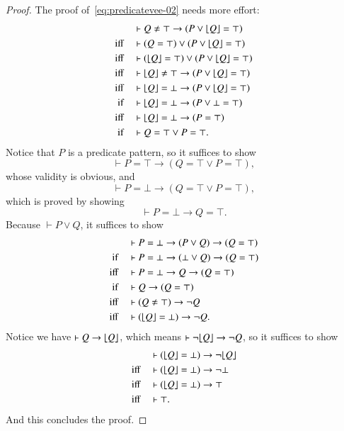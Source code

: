 \documentclass{article}
\theoremstyle{plain}
\DeclarePairedDelimiter\floor{\lfloor}{\rfloor}
\begin{document}
\begin{proof}
The proof of~\eqref{eq:predicatevee-02} needs more effort:
\begin{align*}
&\vdash Q \neq \top \to (P \vee \floor*{Q} = \top) \\
\text{iff} \quad &\vdash (Q = \top) \vee (P \vee \floor*{Q} = \top) \\
\text{iff} \quad &\vdash (\floor*{Q} = \top) \vee (P \vee \floor*{Q} = \top) \\
\text{iff} \quad &\vdash \floor*{Q} \neq \top \to (P \vee \floor*{Q} = \top) \\
\text{iff} \quad &\vdash \floor*{Q} = \bot \to (P \vee \floor*{Q} = \top) \\
\text{if} \quad &\vdash \floor*{Q} = \bot \to (P \vee \bot = \top) \\
\text{iff} \quad &\vdash \floor*{Q} = \bot \to (P = \top) \\
\text{if} \quad &\vdash Q = \top \vee P = \top.
\end{align*}
Notice that $P$ is a predicate pattern, so it suffices to show
\begin{equation*}
\vdash P = \top \to (Q = \top \vee P = \top),
\end{equation*}
whose validity is obvious, and
\begin{equation*}
\vdash P = \bot \to (Q = \top \vee P = \top),
\end{equation*}
which is proved by showing
\begin{equation} 
\vdash P = \bot \to Q = \top.
\end{equation}
Because $\vdash P \vee Q$, it suffices to show
\begin{align*}
&\vdash P = \bot \to (P \vee Q) \to (Q = \top) \\
\text{if} \quad &\vdash P = \bot \to (\bot \vee Q) \to (Q = \top) \\
\text{iff} \quad &\vdash P = \bot \to Q \to (Q = \top) \\
\text{if} \quad &\vdash Q \to (Q = \top) \\
\text{iff} \quad &\vdash (Q \neq \top) \to \neg Q \\
\text{iff} \quad &\vdash (\floor*{Q} = \bot) \to \neg Q.
\end{align*}
Notice we have $\vdash Q \to \floor*{Q}$, which means $\vdash \neg \floor*{Q} \to \neg Q$, so it suffices to show
\begin{align*}
&\vdash (\floor*{Q} = \bot) \to \neg \floor*{Q} \\
\text{iff} \quad &\vdash (\floor*{Q} = \bot) \to \neg \bot \\
\text{iff} \quad &\vdash (\floor*{Q} = \bot) \to \top \\
\text{iff} \quad &\vdash \top.
\end{align*}
And this concludes the proof.
\end{proof}
\end{document}
